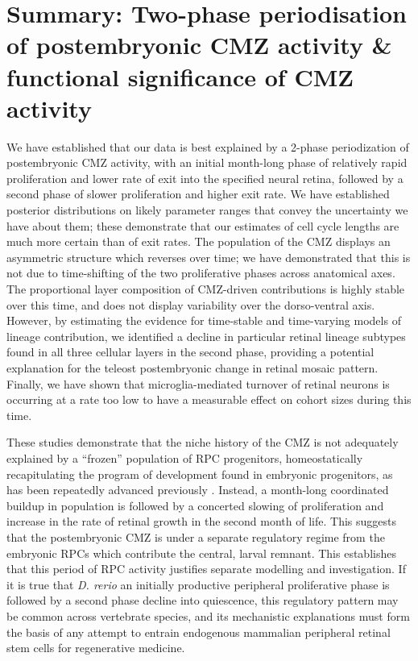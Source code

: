 \section{Summary: Two-phase periodisation of postembryonic CMZ activity \& functional significance of CMZ activity}
We have established that our data is best explained by a 2-phase periodization of postembryonic CMZ activity, with an initial month-long phase of relatively rapid proliferation and lower rate of exit into the specified neural retina, followed by a second phase of slower proliferation and higher exit rate. We have established posterior distributions on likely parameter ranges that convey the uncertainty we have about them; these demonstrate that our estimates of cell cycle lengths are much more certain than of exit rates.  The population of the CMZ displays an asymmetric structure which reverses over time; we have demonstrated that this is not due to time-shifting of the two proliferative phases across anatomical axes. The proportional layer composition of CMZ-driven contributions is highly stable over this time, and does not display variability over the dorso-ventral axis. However, by estimating the evidence for time-stable and time-varying models of lineage contribution, we identified a decline in particular retinal lineage subtypes found in all three cellular layers in the second phase, providing a potential explanation for the teleost postembryonic change in retinal mosaic pattern. Finally, we have shown that microglia-mediated turnover of retinal neurons is occurring at a rate too low to have a measurable effect on cohort sizes during this time.

These studies demonstrate that the niche history of the CMZ is not adequately explained by a ``frozen'' population of RPC progenitors, homeostatically recapitulating the program of development found in embryonic progenitors, as has been repeatedly advanced previously \cite{Harris1998,Wan2016}. Instead, a month-long coordinated buildup in population is followed by a concerted slowing of proliferation and increase in the rate of retinal growth in the second month of life. This suggests that the postembryonic CMZ is under a separate regulatory regime from the embryonic RPCs which contribute the central, larval remnant. This establishes that this period of RPC activity justifies separate modelling and investigation. If it is true that \textit{D. rerio} an initially productive peripheral proliferative phase is followed by a second phase decline into quiescence, this regulatory pattern may be common across vertebrate species, and its mechanistic explanations must form the basis of any attempt to entrain endogenous mammalian peripheral retinal stem cells for regenerative medicine.

